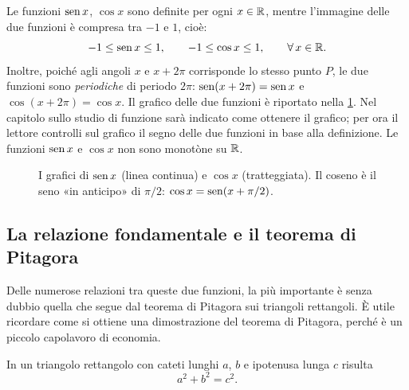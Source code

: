 Le funzioni $\operatorname{sen} x$, $\cos x$ sono definite per ogni $x\in\mathbb{R}$, mentre l'immagine delle
due funzioni è compresa tra $-1$ e $1$, cioè:
\begin{equation}\label{eq:sen-cos-limitate}
  -1\le\operatorname{sen} x\le1, \qquad -1\le\cos x\le1, \qquad\forall\, x\in\mathbb{R}.
\end{equation}
Inoltre, poiché agli angoli $x$ e $x+2\pi$ corrisponde lo stesso punto $P$, le due
funzioni sono \emph{periodiche} di periodo $2\pi$:
$\operatorname{sen}(x+2\pi)=\operatorname{sen} x$ e $\cos(x+2\pi)=\cos x$. Il grafico delle due funzioni è riportato
nella \cref{fig:sen-cos}. Nel capitolo sullo studio di funzione sarà indicato come
ottenere il grafico; per ora il lettore controlli sul grafico il segno delle due funzioni
in base alla definizione. Le funzioni $\operatorname{sen} x$ e $\cos x$ non sono monotòne su $\mathbb{R}$.

\begin{figure}[htb]
\centering
{}
\caption{I grafici di $\operatorname{sen} x$ (linea continua) e $\cos x$ (tratteggiata). Il coseno è
il seno «in anticipo» di $\pi/2$: $\cos x=\operatorname{sen}(x+\pi/2)$.}
\label{fig:sen-cos}
\end{figure}

\subsection{La relazione fondamentale e il teorema di Pitagora}

Delle numerose relazioni tra queste due funzioni, la più importante è senza dubbio
quella che segue dal teorema di Pitagora sui triangoli rettangoli. È utile ricordare
come si ottiene una dimostrazione del teorema di Pitagora, perché è un piccolo
capolavoro di economia.

\begin{teorema}[Pitagora]\label{teo:pitagora}
In un triangolo rettangolo con cateti lunghi $a$, $b$ e ipotenusa lunga $c$ risulta
\begin{equation}\label{eq:pitagora}
  a^{2}+b^{2}=c^{2}.
\end{equation}
\end{teorema}

